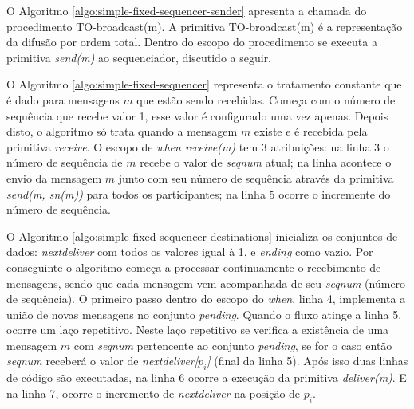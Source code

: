 

O Algoritmo \ref{algo:simple-fixed-sequencer-sender} apresenta a chamada do procedimento TO-broadcast(m). A primitiva TO-broadcast(m) é a representação da difusão por ordem total. Dentro do escopo do procedimento se executa a primitiva \textit{send(m)} ao sequenciador, discutido a seguir.



O Algoritmo \ref{algo:simple-fixed-sequencer} representa o tratamento constante que é dado para mensagens $m$ que estão sendo recebidas. Começa com o número de sequência que recebe valor 1, esse valor é configurado uma vez apenas. Depois disto, o algoritmo só trata quando a mensagem $m$ existe e é recebida pela primitiva \textit{receive}.
O escopo de \textit{when receive(m)} tem 3 atribuições: na linha 3 o número de sequência de $m$ recebe o valor de \textit{seqnum} atual; na linha acontece o envio da mensagem $m$ junto com seu número de sequência através da primitiva \textit{send(m, sn(m))} para todos os participantes; na linha 5 ocorre o incremente do número de sequência.



O Algoritmo \ref{algo:simple-fixed-sequencer-destinations} inicializa os conjuntos de dados: \textit{nextdeliver} com todos os valores igual à 1, e \textit{ending} como vazio. Por conseguinte o algoritmo começa a processar continuamente o recebimento de mensagens, sendo que cada mensagem vem acompanhada de seu \textit{seqnum} (número de sequência). O primeiro passo dentro do escopo do \textit{when}, linha 4, implementa a união de novas mensagens no conjunto \textit{pending}. Quando o fluxo atinge a linha 5, ocorre um laço repetitivo. Neste laço repetitivo se verifica a existência de uma mensagem $m$ com \textit{seqnum} pertencente ao conjunto \textit{pending}, se for o caso então \textit{seqnum} receberá o valor de \textit{nextdeliver[$p_{i}$]} (final da linha 5). Após isso duas linhas de código são executadas, na linha 6 ocorre a execução da primitiva \textit{deliver(m)}. E na linha 7, ocorre o incremento de \textit{nextdeliver} na posição de $p_{i}$.




